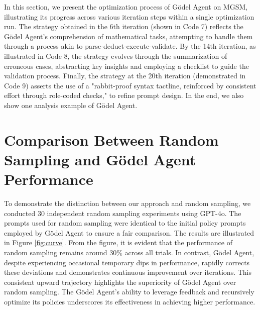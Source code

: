 \documentclass[11pt]{article}
\newcommand{\framework}{Gödel Agent\xspace}
\begin{document}
\label{sec:spacialcode}
In this section, we present the optimization process of \framework on MGSM, illustrating its progress across various iteration steps within a single optimization run. The strategy obtained in the 6th iteration (shown in Code 7) reflects the \framework's comprehension of mathematical tasks, attempting to handle them through a process akin to parse-deduct-execute-validate. By the 14th iteration, as illustrated in Code 8, the strategy evolves through the summarization of erroneous cases, abstracting key insights and employing a checklist to guide the validation process. Finally, the strategy at the 20th iteration (demonstrated in Code 9) asserts the use of a "rabbit-proof syntax tactline, reinforced by consistent effort through role-coded checks," to refine prompt design. In the end, we also show one analysis example of \framework.



\section{Comparison Between Random Sampling and \framework Performance}
To demonstrate the distinction between our approach and random sampling, we conducted 30 independent random sampling experiments using GPT-4o. The prompts used for random sampling were identical to the initial policy prompts employed by Gödel Agent to ensure a fair comparison.
The results are illustrated in Figure \ref{fig:curve}. From the figure, it is evident that the performance of random sampling remains around 30\% across all trials. In contrast, Gödel Agent, despite experiencing occasional temporary dips in performance, rapidly corrects these deviations and demonstrates continuous improvement over iterations.
This consistent upward trajectory highlights the superiority of Gödel Agent over random sampling. The Gödel Agent’s ability to leverage feedback and recursively optimize its policies underscores its effectiveness in achieving higher performance.
\end{document}
